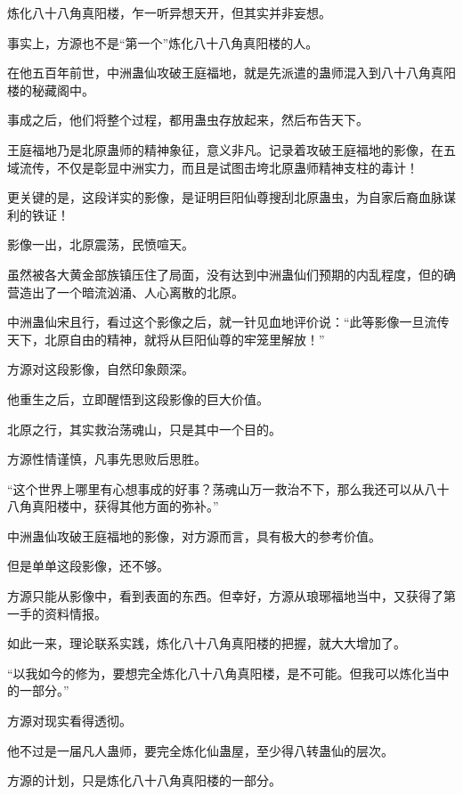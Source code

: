 
\begin{this_body}

炼化八十八角真阳楼，乍一听异想天开，但其实并非妄想。

事实上，方源也不是“第一个”炼化八十八角真阳楼的人。

在他五百年前世，中洲蛊仙攻破王庭福地，就是先派遣的蛊师混入到八十八角真阳楼的秘藏阁中。

事成之后，他们将整个过程，都用蛊虫存放起来，然后布告天下。

王庭福地乃是北原蛊师的精神象征，意义非凡。记录着攻破王庭福地的影像，在五域流传，不仅是彰显中洲实力，而且是试图击垮北原蛊师精神支柱的毒计！

更关键的是，这段详实的影像，是证明巨阳仙尊搜刮北原蛊虫，为自家后裔血脉谋利的铁证！

影像一出，北原震荡，民愤喧天。

虽然被各大黄金部族镇压住了局面，没有达到中洲蛊仙们预期的内乱程度，但的确营造出了一个暗流汹涌、人心离散的北原。

中洲蛊仙宋且行，看过这个影像之后，就一针见血地评价说：“此等影像一旦流传天下，北原自由的精神，就将从巨阳仙尊的牢笼里解放！”

方源对这段影像，自然印象颇深。

他重生之后，立即醒悟到这段影像的巨大价值。

北原之行，其实救治荡魂山，只是其中一个目的。

方源性情谨慎，凡事先思败后思胜。

“这个世界上哪里有心想事成的好事？荡魂山万一救治不下，那么我还可以从八十八角真阳楼中，获得其他方面的弥补。”

中洲蛊仙攻破王庭福地的影像，对方源而言，具有极大的参考价值。

但是单单这段影像，还不够。

方源只能从影像中，看到表面的东西。但幸好，方源从琅琊福地当中，又获得了第一手的资料情报。

如此一来，理论联系实践，炼化八十八角真阳楼的把握，就大大增加了。

“以我如今的修为，要想完全炼化八十八角真阳楼，是不可能。但我可以炼化当中的一部分。”

方源对现实看得透彻。

他不过是一届凡人蛊师，要完全炼化仙蛊屋，至少得八转蛊仙的层次。

方源的计划，只是炼化八十八角真阳楼的一部分。


\end{this_body}

